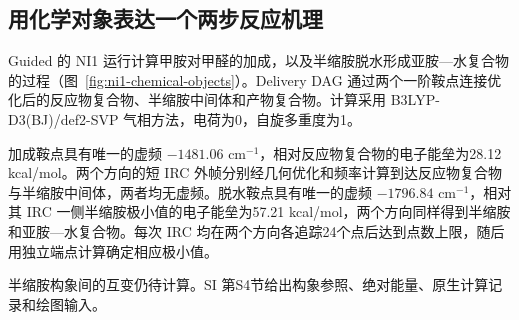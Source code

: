 \subsection{用化学对象表达一个两步反应机理}
\label{sec:ni1-chemical-objects}

Guided 的 NI1 运行计算甲胺对甲醛的加成，以及半缩胺脱水形成亚胺—水复合物的过程（图~\ref{fig:ni1-chemical-objects}）。Delivery DAG 通过两个一阶鞍点连接优化后的反应物复合物、半缩胺中间体和产物复合物。计算采用 B3LYP-D3(BJ)/def2-SVP 气相方法，电荷为0，自旋多重度为1。

加成鞍点具有唯一的虚频 $-1481.06$ cm$^{-1}$，相对反应物复合物的电子能垒为28.12 kcal/mol。两个方向的短 IRC 外帧分别经几何优化和频率计算到达反应物复合物与半缩胺中间体，两者均无虚频。脱水鞍点具有唯一的虚频 $-1796.84$ cm$^{-1}$，相对其 IRC 一侧半缩胺极小值的电子能垒为57.21 kcal/mol，两个方向同样得到半缩胺和亚胺—水复合物。每次 IRC 均在两个方向各追踪24个点后达到点数上限，随后用独立端点计算确定相应极小值。

半缩胺构象间的互变仍待计算。SI 第S4节给出构象参照、绝对能量、原生计算记录和绘图输入。


